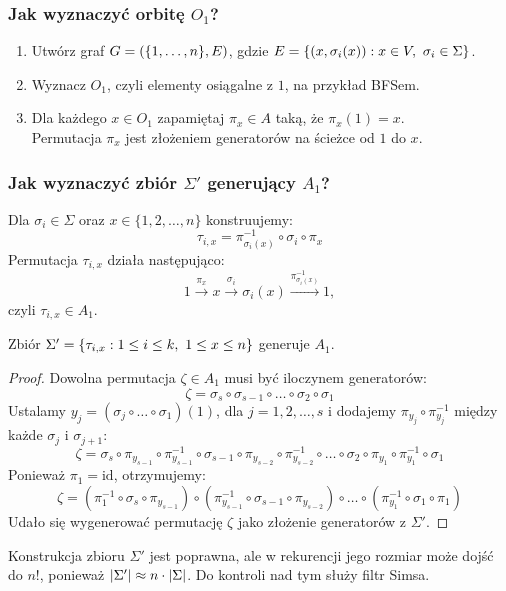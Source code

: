 \subsubsection*{Jak wyznaczyć orbitę \(O_1\)?}
\begin{greyframe}
	\begin{enumerate}
		\item Utwórz graf \( G=(\set{1, \ldots, n}, E) \), gdzie \( E = \set{(x, \sigma_i(x)) : x \in V, \ \sigma_i \in \Sigma } \).
		\item Wyznacz \( O_1 \), czyli elementy osiągalne z \( 1 \), na przykład BFSem.
		\item Dla każdego \( x \in O_1 \) zapamiętaj \( \pi_x \in A \) taką, że \( \pi_x(1) = x \). \\
		      Permutacja \(\pi_x\) jest złożeniem generatorów na ścieżce od \( 1 \) do \( x \).
	\end{enumerate}
\end{greyframe}

\subsubsection*{Jak wyznaczyć zbiór \(\Sigma'\) generujący \(A_1\)?}
Dla \(\sigma_i \in \Sigma\) oraz \(x \in \{1, 2, \ldots, n\}\) konstruujemy:
\[
	\tau_{i,x} = \pi_{\sigma_i(x)}^{-1} \circ \sigma_i \circ \pi_x
\]
Permutacja \(\tau_{i,x}\) działa następująco:
\[
	1 \xrightarrow{\pi_x} x \xrightarrow{\sigma_i} \sigma_i(x) \xrightarrow{\pi_{\sigma_i(x)}^{-1}} 1,
\]
czyli \(\tau_{i,x} \in A_1\).

\begin{lemma}[Schreiera]
	Zbiór \( \Sigma' = \set{\tau_{i,x} : 1 \leq i \leq k, \ 1 \leq x \leq n} \) generuje \( A_1 \).
\end{lemma}
\begin{proof}
	Dowolna permutacja \(\zeta \in A_1\) musi być iloczynem generatorów:
	\[
		\zeta = \sigma_s \circ \sigma_{s-1} \circ \ldots \circ \sigma_2 \circ \sigma_1
	\]
	Ustalamy \(y_j = (\sigma_j \circ \ldots \circ \sigma_1)(1)\), dla \(j = 1, 2, \ldots, s\) i dodajemy \(\pi_{y_j} \circ \pi_{y_j}^{-1}\) między każde \(\sigma_j\) i \(\sigma_{j+1}\):
	\[
		\zeta = \sigma_s \circ \pi_{y_{s-1}} \circ \pi_{y_{s-1}}^{-1} \circ \sigma_{s-1} \circ \pi_{y_{s-2}} \circ \pi_{y_{s-2}}^{-1} \circ \ldots \circ \sigma_2 \circ \pi_{y_1} \circ \pi_{y_1}^{-1} \circ \sigma_1
	\]
	Ponieważ \(\pi_1 = \text{id}\), otrzymujemy:
	\[
		\zeta = (\pi_1^{-1} \circ \sigma_s \circ \pi_{y_{s-1}}) \circ (\pi_{y_{s-1}}^{-1} \circ \sigma_{s-1} \circ \pi_{y_{s-2}}) \circ \ldots \circ (\pi_{y_1}^{-1} \circ \sigma_1 \circ \pi_1)
	\]
	Udało się wygenerować permutację \(\zeta\) jako złożenie generatorów z \(\Sigma'\).
\end{proof}
Konstrukcja zbioru \( \Sigma' \) jest poprawna, ale w rekurencji jego rozmiar może dojść do \( n! \), ponieważ \( \left\lvert\Sigma'\right\rvert \approx n \cdot \left\lvert\Sigma\right\rvert \).
Do kontroli nad tym służy filtr Simsa.

